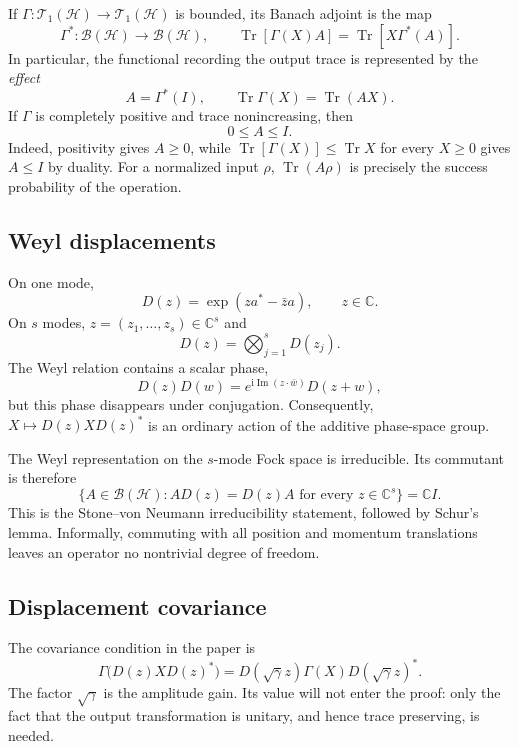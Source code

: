 \documentclass[11pt]{article}
\newcommand{\Hc}{\mathcal H}
\newcommand{\T}{\mathcal T_1}
\newcommand{\Bop}{\mathcal B}
\newcommand{\C}{\mathbb C}
\newcommand{\Tr}{\operatorname{Tr}}
\begin{document}
If $\Gamma:\T(\Hc)\to\T(\Hc)$ is bounded, its Banach adjoint is the map
\[
  \Gamma^*:\Bop(\Hc)\longrightarrow\Bop(\Hc),
  \qquad
  \Tr[\Gamma(X)A]=\Tr[X\Gamma^*(A)].
\]
In particular, the functional recording the output trace is represented by
the \emph{effect}
\begin{equation}\label{eq:effect}
  A=\Gamma^*(I),
  \qquad
  \Tr\Gamma(X)=\Tr(AX).
\end{equation}
If $\Gamma$ is completely positive and trace nonincreasing, then
\[
  0\leq A\leq I.
\]
Indeed, positivity gives $A\geq0$, while
$\Tr[\Gamma(X)]\leq\Tr X$ for every $X\geq0$ gives $A\leq I$ by duality.
For a normalized input $\rho$, $\Tr(A\rho)$ is precisely the success
probability of the operation.

\subsection{Weyl displacements}

On one mode,
\[
  D(z)=\exp(za^*-\bar z a),\qquad z\in\C.
\]
On $s$ modes, $z=(z_1,\ldots,z_s)\in\C^s$ and
\[
  D(z)=\bigotimes_{j=1}^sD(z_j).
\]
The Weyl relation contains a scalar phase,
\[
  D(z)D(w)=e^{\mathrm i\operatorname{Im}(z\cdot\bar w)}D(z+w),
\]
but this phase disappears under conjugation.  Consequently,
$X\mapsto D(z)XD(z)^*$ is an ordinary action of the additive phase-space
group.

The Weyl representation on the $s$-mode Fock space is irreducible.  Its
commutant is therefore
\begin{equation}\label{eq:weyl-commutant}
  \{A\in\Bop(\Hc):AD(z)=D(z)A\text{ for every }z\in\C^s\}
  =\C I.
\end{equation}
This is the Stone--von Neumann irreducibility statement, followed by Schur's
lemma.  Informally, commuting with all position and momentum translations
leaves an operator no nontrivial degree of freedom.

\subsection{Displacement covariance}

The covariance condition in the paper is
\begin{equation}\label{eq:covariance}
  \Gamma\bigl(D(z)XD(z)^*\bigr)
  =D(\sqrt\gamma z)\Gamma(X)D(\sqrt\gamma z)^*.
\end{equation}
The factor $\sqrt\gamma$ is the amplitude gain.  Its value will not enter the
proof: only the fact that the output transformation is unitary, and hence
trace preserving, is needed.
\end{document}

